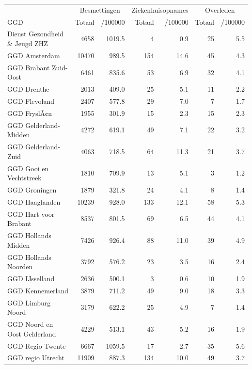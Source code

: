\documentclass[
  english,
  man,floatsintext]{apa6}
\begin{document}
\begin{table}[H]
\centering\begingroup\fontsize{10}{12}\selectfont

\begin{threeparttable}
\begin{tabular}{lrrrrrr}
\toprule
\multicolumn{1}{c}{ } & \multicolumn{2}{c}{Besmettingen} & \multicolumn{2}{c}{Ziekenhuisopnames} & \multicolumn{2}{c}{Overleden} \\
\cmidrule(l{3pt}r{3pt}){2-3} \cmidrule(l{3pt}r{3pt}){4-5} \cmidrule(l{3pt}r{3pt}){6-7}
GGD & Totaal & /100000 & Totaal & /100000 & Totaal & /100000\\
\midrule
Dienst Gezondheid \& Jeugd ZHZ & 4658 & 1019.5 & 4 & 0.9 & 25 & 5.5\\
GGD Amsterdam & 10470 & 989.5 & 154 & 14.6 & 45 & 4.3\\
GGD Brabant Zuid-Oost & 6461 & 835.6 & 53 & 6.9 & 32 & 4.1\\
GGD Drenthe & 2013 & 409.0 & 25 & 5.1 & 11 & 2.2\\
GGD Flevoland & 2407 & 577.8 & 29 & 7.0 & 7 & 1.7\\
GGD FryslÃ¢n & 1955 & 301.9 & 15 & 2.3 & 15 & 2.3\\
GGD Gelderland-Midden & 4272 & 619.1 & 49 & 7.1 & 22 & 3.2\\
GGD Gelderland-Zuid & 4063 & 718.5 & 64 & 11.3 & 21 & 3.7\\
GGD Gooi en Vechtstreek & 1810 & 709.9 & 13 & 5.1 & 3 & 1.2\\
GGD Groningen & 1879 & 321.8 & 24 & 4.1 & 8 & 1.4\\
GGD Haaglanden & 10239 & 928.0 & 133 & 12.1 & 58 & 5.3\\
GGD Hart voor Brabant & 8537 & 801.5 & 69 & 6.5 & 44 & 4.1\\
GGD Hollands Midden & 7426 & 926.4 & 88 & 11.0 & 39 & 4.9\\
GGD Hollands Noorden & 3792 & 576.2 & 23 & 3.5 & 16 & 2.4\\
GGD IJsselland & 2636 & 500.1 & 3 & 0.6 & 10 & 1.9\\
GGD Kennemerland & 3879 & 711.2 & 49 & 9.0 & 18 & 3.3\\
GGD Limburg Noord & 3179 & 622.2 & 25 & 4.9 & 7 & 1.4\\
GGD Noord en Oost Gelderland & 4229 & 513.1 & 43 & 5.2 & 16 & 1.9\\
GGD Regio Twente & 6667 & 1059.5 & 17 & 2.7 & 35 & 5.6\\
GGD regio Utrecht & 11909 & 887.3 & 134 & 10.0 & 49 & 3.7\\

\end{tabular}
\end{threeparttable}
\end{table}
\end{document}
